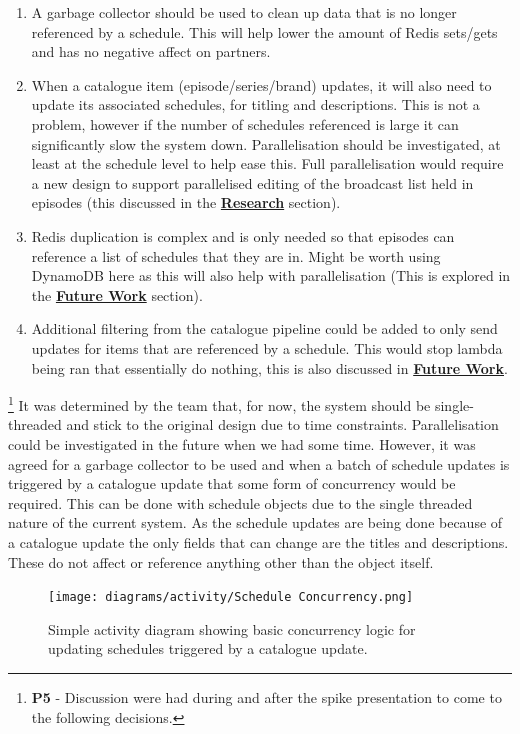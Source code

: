   \begin{enumerate}
    \item A garbage collector should be used to clean up data that is no longer referenced by a schedule. This will help lower the amount of Redis sets/gets
    and has no negative affect on partners.
    \item When a catalogue item (episode/series/brand) updates, it will also need to update its associated schedules, for titling and descriptions. This 
    is not a problem, however if the number of schedules referenced is large it can significantly slow the system down. Parallelisation should be 
    investigated, at least at the schedule level to help ease this. Full parallelisation would require a new design to support parallelised editing of the 
    broadcast list held in episodes (this discussed in the \hyperref[sec:storageSolutions]{\textbf{Research}} section).
    \item Redis duplication is complex and is only needed so that episodes can reference a list of schedules that they are in. Might be worth using 
    DynamoDB here as this will also help with parallelisation (This is explored in the \hyperref[sec:future]{\textbf{Future Work}} section).
    \item Additional filtering from the catalogue pipeline could be added to only send updates for items that are referenced by a schedule. This would 
    stop lambda being ran that essentially do nothing, this is also discussed in \hyperref[sec:future]{\textbf{Future Work}}.
  \end{enumerate}

  \footnote{\textbf{P5} - Discussion were had during and after the spike presentation to come to the following decisions.}
  It was determined by the team that, for now, the system should be single-threaded and stick to the original design due to time constraints.
  Parallelisation could be investigated in the future when we had some time. However, it was agreed for a garbage collector to be used and 
  when a batch of schedule updates is triggered by a catalogue update that some form of concurrency would be required. This can be done with schedule
  objects due to the single threaded nature of the current system. As the schedule updates are being done because of a catalogue update the only 
  fields that can change are the titles and descriptions. These do not affect or reference anything other than the object itself.

  \begin{figure}[H]
    \centering
    \texttt{[image: diagrams/activity/Schedule Concurrency.png]}
    \caption{Simple activity diagram showing basic concurrency logic for updating schedules triggered by a catalogue update.}
    \label{fig:scheduleConcurrency}
  \end{figure}

\newpage